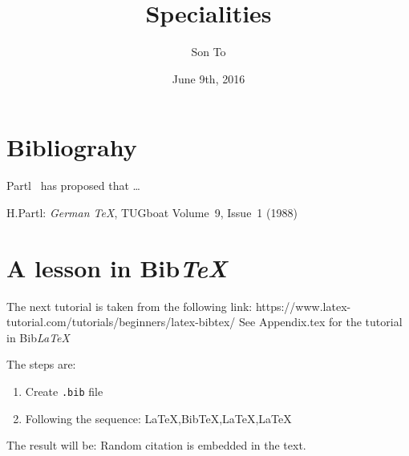 \documentclass[a4paper,11pt]{article}
\author{Son To}
\date{June 9th, 2016}
\title{Specialities}
\begin{document}
  \maketitle
  \tableofcontents
  \newpage
  \section{Bibliograhy}
Partl~\cite{pa} has
proposed that \ldots
  \begin{thebibliography}{99}
    H.Partl:
    \emph{German \TeX},
    TUGboat Volume~9, Issue~1 (1988)
  \end{thebibliography}

\section{A lesson in Bib\emph{TeX}}
The next tutorial is taken from the
following link: https://www.latex-tutorial.com/tutorials/beginners/latex-bibtex/
See Appendix.tex for the tutorial in Bib\emph{LaTeX}

The steps are:
\flushleft
\begin{enumerate}
  \item Create \verb+.bib+ file
  \item Following the sequence: La\TeX,Bib\TeX,La\TeX,La\TeX
\end{enumerate}
The result will be:
Random citation \cite{DUMMY:1} is embedded in the text.
\newpage


\end{document}
